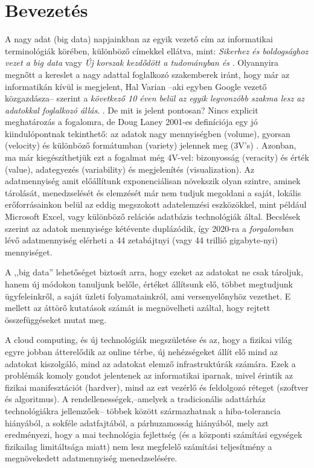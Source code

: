 \documentclass[a4paper,12pt]{article}
\author{Belényesi Roland}
\begin{document}
\tableofcontents
\newpage

\section{Bevezetés}
A nagy adat (big data) napjainkban az egyik vezető cím az informatikai terminológiák körében, különböző címekkel ellátva, mint: 
\textsl{Sikerhez és boldogsághoz vezet a big data} \cite{ori} vagy 
\textsl{Új korszak kezdődött a tudományban és} \cite{oria}. Olyannyira megnőtt a kereslet a nagy adattal foglalkozó szakemberek iránt, hogy már az informatikán kívül is megjelent, Hal Varian --aki egyben Google vezető közgazdásza-- szerint a \textsl{következő 10 éven belül az egyik legvonzóbb szakma lesz az adatokkal foglalkozó állás}. \cite{varian}. De mit is jelent pontosan? Nincs explicit meghatározás a fogalomra, de Doug Laney 2001-es definíciója egy jó kiindulópontnak tekinthető: az adatok nagy mennyiségben (volume), gyorsan (velocity) és különböző formátumban (variety) jelennek meg (3V's) \cite{3v}. Azonban, ma már kiegészíthetjük ezt a fogalmat még 4V-vel: bizonyosság (veracity) és érték (value), adategyezés (variability) és megjelenítés (visualization).\cite{7v} Az adatmennyiség amit előállítunk exponenciálisan növekszik olyan szintre, aminek tárolását, menedzselését és elemzését már nem tudjuk megoldani a saját, lokális erőforrásainkon belül az eddig megszokott adatelemzési eszközökkel, mint például Microsoft Excel, vagy különböző relációs adatbázis technológiák által.
Becslések\cite{2020} szerint az adatok mennyisége kétévente duplázódik, így 2020-ra a \textsl{forgalomban} lévő adatmennyiség elérheti a 44 zetabájtnyi (vagy 44 trillió gigabyte-nyi) mennyiséget.
\newline

A ,,big data'' lehetőséget biztosít arra, hogy ezeket az adatokat ne csak tároljuk, hanem új módokon tanuljunk belőle, értéket állítsunk elő, többet megtudjunk ügyfeleinkről, a saját üzleti folyamatainkról, ami versenyelőnyhöz vezethet. E mellett az áttörő kutatások számát is megnövelheti azáltal, hogy rejtett összefüggéseket mutat meg.\cite{brk} 

A cloud computing, és új technológiák megszületése és az, hogy a fizikai világ egyre jobban átterelődik az online térbe, új nehézségeket állít elő mind az adatokat kiszolgáló, mind az adatokat elemző infrastruktúrák számára. Ezek a problémák komoly gondot jelentenek az informatikai iparnak, mivel érintik az fizikai manifesztációt (hardver), mind az ezt vezérlő és feldolgozó réteget (szoftver és algoritmus). A rendellenességek,--amelyek a tradicionális adattárház technológiákra jellemzőek-- többek között származhatnak a hiba-tolerancia hiányából, a sokféle adatfajtából, a párhuzamosság hiányából, mely azt eredményezi, hogy a mai technológia fejlettség (és a központi számítási egységek fizikailag limitáltsága miatt) nem lesz megfelelő számítási teljesítmény a megnövekedett adatmennyiség menedzselésére.
\end{document}
